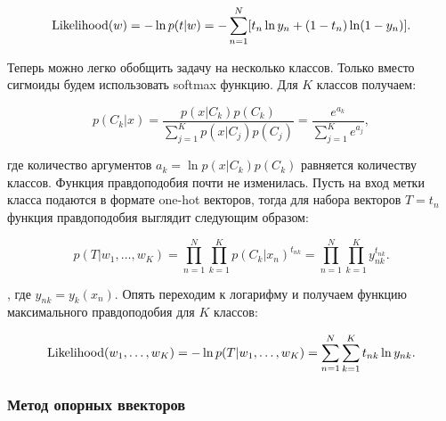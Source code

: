 \begin{equation}
 \operatorname*{Likelihood} (w) = -\ln p(t|w) = -\sum_{n=1}^N[t_n \ln y_n + (1-t_n) \ln (1-y_n)].
\end{equation}

Теперь можно легко обобщить задачу на несколько классов. Только вместо сигмоиды будем использовать softmax
функцию. Для $K$ классов получаем:

\begin{equation}
 p(C_k|x) = \frac{p(x|C_k)p(C_k)}{\sum_{j=1}^K p(x|C_j)p(C_j)} = \frac{e^{a_k}}{\sum_{j=1}^K e^{a_j}},
\end{equation}

где количество аргументов $a_k = \ln p(x|C_k)p(C_k)$ равняется количеству классов. Функция правдоподобия почти
не изменилась. Пусть на вход метки класса подаются в формате one-hot векторов, тогда для набора векторов $T =
{t_n}$ функция правдоподобия выглядит следующим образом:

\begin{equation}
 p(T|w_1,\ldots,w_K) = \prod_{n=1}^N \prod_{k=1}^K p(C_k|x_n)^{t_{nk}} = \prod_{n=1}^N \prod_{k=1}^K
y_{nk}^{t_{nk}}.
\end{equation}

, где $y_{nk} = y_k(x_n)$. Опять переходим к логарифму и получаем функцию максимального правдоподобия для $K$
классов:

\begin{equation}
 \operatorname*{Likelihood} (w_1,\ldots,w_K) = -\ln p(T|w_1,\ldots,w_K) = \sum_{n=1}^N \sum_{k=1}^K t_{nk}\ln y_{nk}.
\end{equation}


\subsubsection{Метод опорных ввекторов}






























